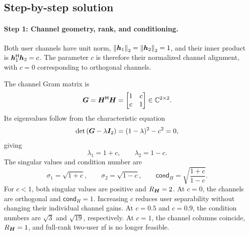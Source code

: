 \subsection{Step-by-step solution}

\paragraph{Step 1: Channel geometry, rank, and conditioning.}
Both user channels have unit norm, $\left\|\bm{h}_1\right\|_2=\left\|\bm{h}_2\right\|_2=1$, and their inner product is ${\bm{h}}^{\mathsf{H}}_1\bm{h}_2=c$. The parameter $c$ is therefore their normalized channel alignment, with $c=0$ corresponding to orthogonal channels.

The channel Gram matrix is
\begin{equation*}
	\bm{G}={\bm{H}}^{\mathsf{H}}\bm{H}
	=\begin{bmatrix}1&c\\c&1\end{bmatrix}
	\in\mathbb{C}^{2\times2}.
\end{equation*}
Its eigenvalues follow from the characteristic equation
\begin{equation*}
	\operatorname{det}\left(\bm{G}-\lambda\bm{I}_2\right)
	=(1-\lambda)^2-c^2=0,
\end{equation*}
giving
\begin{equation*}
	\lambda_1=1+c,\qquad \lambda_2=1-c.
\end{equation*}
The singular values and condition number are
\begin{equation}
	\sigma_1=\sqrt{1+c},\qquad
	\sigma_2=\sqrt{1-c},\qquad
	\mathsf{cond}_H=\sqrt{\frac{1+c}{1-c}}.
	\label{eq06:mu-conditioning}
\end{equation}
For $c<1$, both singular values are positive and $R_{\bm{H}}=2$. At $c=0$, the channels are orthogonal and $\mathsf{cond}_H=1$. Increasing $c$ reduces user separability without changing their individual channel gains. At $c=0.5$ and $c=0.9$, the condition numbers are $\sqrt3$ and $\sqrt{19}$, respectively. At $c=1$, the channel columns coincide, $R_{\bm{H}}=1$, and full-rank two-user \ac{zf} is no longer feasible.

